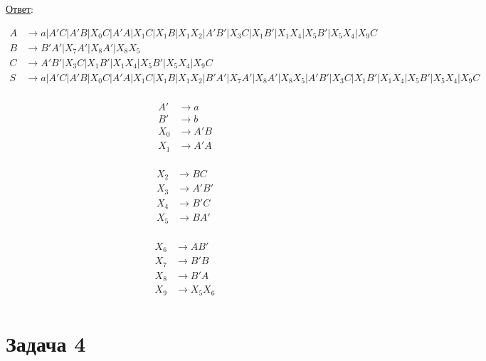 \documentclass[a4paper]{article}
\begin{document}
\underline{Ответ}:
\vspace{-6ex}
\begin{multicols}{2}
	\begin{align*}
		A &\to a|A'C|A'B|X_0C|A'A|X_1C|X_1B|X_1X_2|A'B'|X_3C|X_1B'|X_1X_4|X_5B'|X_5X_4|X_9C\\
		B &\to B'A'|X_7A'|X_8A'|X_8X_5\\
		C &\to A'B'|X_3C|X_1B'|X_1X_4|X_5B'|X_5X_4|X_9C\\
		S &\to a|A'C|A'B|X_0C|A'A|X_1C|X_1B|X_1X_2|B'A'|X_7A'|X_8A'|X_8X_5|A'B'|X_3C|X_1B'|X_1X_4|X_5B'|X_5X_4|X_9C\\			
	\end{align*}
\end{multicols}
\vspace{-6ex}
\vspace{-6ex}
\begin{multicols}{3}
	\begin{align*}
		A' &\to a\\
		B' &\to b\\
		X_0 &\to A'B\\
		X_1 &\to A'A\\
	\end{align*}	
	
	\begin{align*}
		X_2 &\to BC\\
		X_3 &\to A'B'\\
		X_4 &\to B'C\\
		X_5 &\to BA'\\		
	\end{align*}	
	
	\begin{align*}
		X_6 &\to AB'\\
		X_7 &\to B'B\\
		X_8 &\to B'A\\
		X_9 &\to X_5X_6\\
	\end{align*}	
\end{multicols}
\vspace{-7ex}
\section*{Задача 4}
\newpage
\end{document}
